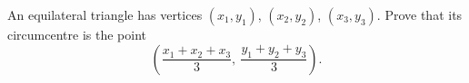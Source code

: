 An equilateral triangle has vertices $(x_1,y_1)$, $(x_2,y_2)$, $(x_3,y_3)$. Prove that its circumcentre is the point
\[
\left(\dfrac{x_1+x_2+x_3}{3},\ \dfrac{y_1+y_2+y_3}{3}\right).
\]
